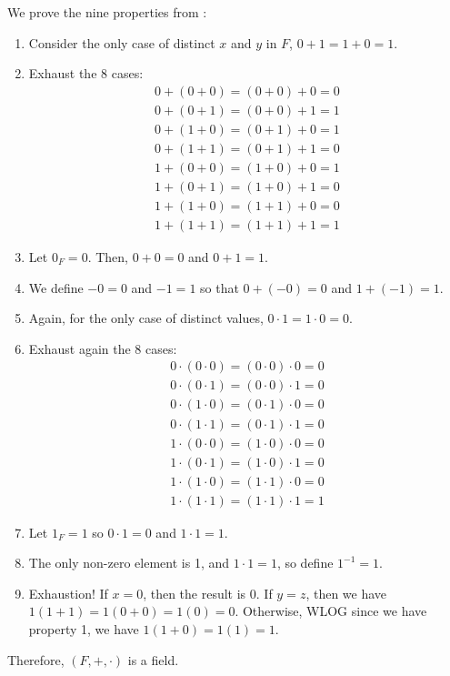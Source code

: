 \documentclass{agony}
\begin{document}
\begin{prf}
  We prove the nine properties from :
  \begin{enumerate}
    \item Consider the only case of distinct $x$ and $y$ in $F$, $0 + 1 = 1 + 0 = 1$.
    \item Exhaust the 8 cases:
          \begin{align*}
            0 + (0 + 0) = (0 + 0) + 0 = 0 \\
            0 + (0 + 1) = (0 + 0) + 1 = 1 \\
            0 + (1 + 0) = (0 + 1) + 0 = 1 \\
            0 + (1 + 1) = (0 + 1) + 1 = 0 \\
            1 + (0 + 0) = (1 + 0) + 0 = 1 \\
            1 + (0 + 1) = (1 + 0) + 1 = 0 \\
            1 + (1 + 0) = (1 + 1) + 0 = 0 \\
            1 + (1 + 1) = (1 + 1) + 1 = 1
          \end{align*}
    \item Let $0_F=0$. Then, $0 + 0 = 0$ and $0 + 1 = 1$.
    \item We define $-0 = 0$ and $-1 = 1$ so that $0 + (-0) = 0$ and $1 + (-1) = 1$.
    \item Again, for the only case of distinct values, $0 \cdot 1 = 1 \cdot 0 = 0$.
    \item Exhaust again the 8 cases:
          \begin{align*}
            0 \cdot (0 \cdot 0) = (0 \cdot 0) \cdot 0 = 0 \\
            0 \cdot (0 \cdot 1) = (0 \cdot 0) \cdot 1 = 0 \\
            0 \cdot (1 \cdot 0) = (0 \cdot 1) \cdot 0 = 0 \\
            0 \cdot (1 \cdot 1) = (0 \cdot 1) \cdot 1 = 0 \\
            1 \cdot (0 \cdot 0) = (1 \cdot 0) \cdot 0 = 0 \\
            1 \cdot (0 \cdot 1) = (1 \cdot 0) \cdot 1 = 0 \\
            1 \cdot (1 \cdot 0) = (1 \cdot 1) \cdot 0 = 0 \\
            1 \cdot (1 \cdot 1) = (1 \cdot 1) \cdot 1 = 1
          \end{align*}
    \item Let $1_F=1$ so $0 \cdot 1 = 0$ and $1 \cdot 1 = 1$.
    \item The only non-zero element is 1, and $1 \cdot 1 = 1$, so define $1^{-1} = 1$.
    \item Exhaustion! If $x=0$, then the result is 0.
          If $y = z$, then we have $1(1 + 1) = 1(0 + 0) = 1(0) = 0$.
          Otherwise, WLOG since we have property 1, we have $1(1 + 0) = 1(1) = 1$.
  \end{enumerate}
  Therefore, $(F,+,\cdot)$ is a field.
\end{prf}
\end{document}

